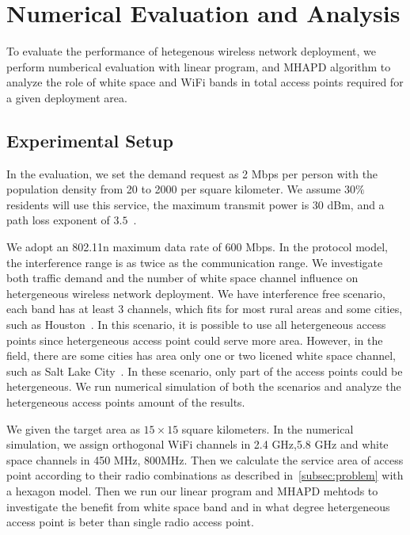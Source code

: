 \section{Numerical Evaluation and Analysis}
\label{sec:experimentdesign}
To evaluate the performance of hetegenous wireless network deployment, we perform  
numberical evaluation with linear program, and MHAPD algorithm to analyze the role
of white space and WiFi bands in total access points required for a given deployment 
area.

\subsection{Experimental Setup}
In the evaluation, we set the demand request as 2 Mbps per person with the population
density from 20 to 2000 per square kilometer. We assume $30\%$ residents will use this
service, the maximum transmit power is 30 dBm, and a path loss exponent of $3.5$~\cite{meikle2012global}. 

We adopt an 802.11n maximum data rate of 600 Mbps. In the protocol model, the interference 
range is as twice as the communication range. We investigate both traffic demand and the 
number of white space channel influence on hetergeneous wireless network deployment. 
We have interference free scenario, each band has at least 3 channels, which fits for
most rural areas and some cities, such as Houston~\cite{googledatabase}. In this scenario,
it is possible to use all hetergeneous access points since hetergeneous access point could 
serve more area. However, in the field, there are some cities has area only one or two 
licened white space channel, such as Salt Lake City~\cite{googledatabase}. In these scenario, 
only part of the access points could be hetergeneous. We run numerical simulation of
both the scenarios and analyze the hetergeneous access points amount of the results.

We given the target area as $15\times 15$ square kilometers. In the numerical simulation, 
we assign orthogonal WiFi channels in 2.4 GHz,5.8 GHz and white space 
channels in 450 MHz, 800MHz. Then we calculate the service area of access point according to 
their radio combinations as described in~\ref{subsec:problem} with a hexagon model. Then we 
run our linear program and MHAPD mehtods to investigate the benefit from white space band 
and in what degree hetergeneous access point is beter than single radio access point. 


